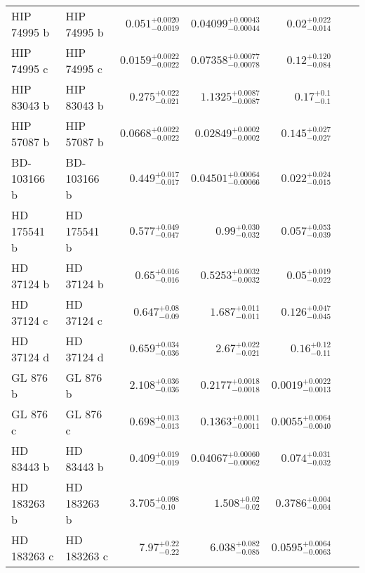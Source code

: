 \begin{longtable*}{llrrrrr}
HIP 74995 b & HIP 74995 b & $0.051^{+0.0020}_{-0.0019}$ & $0.04099^{+0.00043}_{-0.00044}$ & $0.02^{+0.022}_{-0.014}$ & \cite{Bonfils05} & \\ 
HIP 74995 c & HIP 74995 c & $0.0159^{+0.0022}_{-0.0022}$ & $0.07358^{+0.00077}_{-0.00078}$ & $0.12^{+0.120}_{-0.084}$ & \cite{Mayor09} & \\ 
HIP 83043 b & HIP 83043 b & $0.275^{+0.022}_{-0.021}$ & $1.1325^{+0.0087}_{-0.0087}$ & $0.17^{+0.1}_{-0.1}$ & \cite{Johnson10} & \\ 
HIP 57087 b & HIP 57087 b & $0.0668^{+0.0022}_{-0.0022}$ & $0.02849^{+0.0002}_{-0.0002}$ & $0.145^{+0.027}_{-0.027}$ & \cite{Butler04} & \\ 
BD-103166 b & BD-103166 b & $0.449^{+0.017}_{-0.017}$ & $0.04501^{+0.00064}_{-0.00066}$ & $0.022^{+0.024}_{-0.015}$ & \cite{Butler00} & \\ 
HD 175541 b & HD 175541 b & $0.577^{+0.049}_{-0.047}$ & $0.99^{+0.030}_{-0.032}$ & $0.057^{+0.053}_{-0.039}$ & \cite{Johnson07} & \\ 
HD 37124 b & HD 37124 b & $0.65^{+0.016}_{-0.016}$ & $0.5253^{+0.0032}_{-0.0032}$ & $0.05^{+0.019}_{-0.022}$ & \cite{Butler03} & \\ 
HD 37124 c & HD 37124 c & $0.647^{+0.08}_{-0.09}$ & $1.687^{+0.011}_{-0.011}$ & $0.126^{+0.047}_{-0.045}$ & \cite{Butler03} & \\ 
HD 37124 d & HD 37124 d & $0.659^{+0.034}_{-0.036}$ & $2.67^{+0.022}_{-0.021}$ & $0.16^{+0.12}_{-0.11}$ & \cite{Vogt05} & \\ 
GL 876 b & GL 876 b & $2.108^{+0.036}_{-0.036}$ & $0.2177^{+0.0018}_{-0.0018}$ & $0.0019^{+0.0022}_{-0.0013}$ & \cite{Marcy01} & \\ 
GL 876 c & GL 876 c & $0.698^{+0.013}_{-0.013}$ & $0.1363^{+0.0011}_{-0.0011}$ & $0.0055^{+0.0064}_{-0.0040}$ & \cite{Marcy01} & \\ 
HD 83443 b & HD 83443 b & $0.409^{+0.019}_{-0.019}$ & $0.04067^{+0.00060}_{-0.00062}$ & $0.074^{+0.031}_{-0.032}$ & \cite{Butler02} & \\ 
HD 183263 b & HD 183263 b & $3.705^{+0.098}_{-0.10}$ & $1.508^{+0.02}_{-0.02}$ & $0.3786^{+0.004}_{-0.004}$ & \cite{Marcy05} & \\ 
HD 183263 c & HD 183263 c & $7.97^{+0.22}_{-0.22}$ & $6.038^{+0.082}_{-0.085}$ & $0.0595^{+0.0064}_{-0.0063}$ & \cite{Wright09} & \\ 
\bottomrule 
\end{longtable*} 
